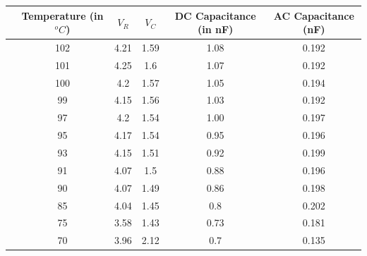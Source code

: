 \documentclass[a4paper]{article}
\begin{document}
\begin{table}[htb]
    \centering
    \begin{tabular}{@{}cccccc@{}}
        \toprule
         & Temperature (in $^oC$) & $V_R$ & $V_C$ & DC Capacitance (in nF) & AC Capacitance (nF) \\
        \midrule
         & 102 & 4.21 & 1.59 & 1.08 & 0.192 \\
         & 101 & 4.25 & 1.6 & 1.07 & 0.192 \\
         & 100 & 4.2 & 1.57 & 1.05 & 0.194 \\
         & 99 & 4.15 & 1.56 & 1.03 & 0.192 \\
         & 97 & 4.2 & 1.54 & 1.00 & 0.197 \\
         & 95 & 4.17 & 1.54 & 0.95 & 0.196 \\
         & 93 & 4.15 & 1.51 & 0.92 & 0.199 \\
         & 91 & 4.07 & 1.5 & 0.88 & 0.196 \\
         & 90 & 4.07 & 1.49 & 0.86 & 0.198 \\
         & 85 & 4.04 & 1.45 & 0.8 & 0.202 \\
         & 75 & 3.58 & 1.43 & 0.73 & 0.181 \\
         & 70 & 3.96 & 2.12 & 0.7 & 0.135 \\
        \bottomrule
    \end{tabular}
\end{table}
\end{document}
